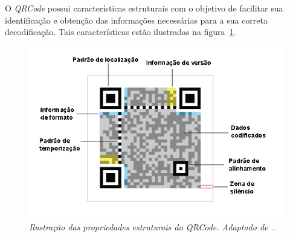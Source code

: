 	
	O \textit{QRCode} possui características estruturais com o objetivo de facilitar sua identificação
	e obtenção das informações necessárias para a sua correta decodificação. Tais características
	estão ilustradas na figura~\ref{fig:qrCode}.
				
	\begin{figure}[htb]
		\centering \includegraphics[scale=0.6]{figuras/cap2/qranatomy.png}
		\caption{\textit{Ilustração das propriedades estruturais do QRCode. Adaptado de~\cite{qrcodespec}.}}
		\label{fig:qrCode} 
	\end{figure} 
	
